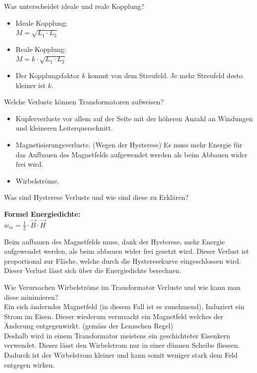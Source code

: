 \begin{karte}{Was unterscheidet ideale und reale Kopplung?}
	\begin{itemize}
		\item Ideale Kopplung:\\
		$ M = \sqrt{L_1 \cdot L_2} $
		\item Reale Kopplung:\\
		$ M = k \cdot \sqrt{L_1 \cdot L_2} $
		\item Der Kopplungsfaktor $k$ kommt von dem Streufeld. Je mehr Streufeld desto kleiner ist $k$.
	\end{itemize}
\end{karte}

\begin{karte}{Welche Verluste können Transformatoren aufweisen?}
	\begin{itemize}
		\item Kupferverluste vor allem auf der Seite mit der höheren Anzahl an Windungen und kleineren Leiterquerschnitt.
		\item Magnetisierungsverluste. (Wegen der Hysterese) Es muss mehr Energie für das Aufbauen des Magnetfelds aufgewendet werden als beim Abbauen wider frei wird.
		\item Wirbelströme.
	\end{itemize}
\end{karte}

\begin{karte}{Was sind Hysterese Verluste und wie sind diese zu Erklären?}
	\begin{minipage}{0.49\textwidth}
		
	\end{minipage}
	\begin{minipage}{0.49\textwidth}
		\textbf{Formel Energiedichte:}\\[10pt]
		$
			w_m = \frac{1}{2} \cdot \vec{B} \cdot \vec{H}
		$
	\end{minipage}
	Beim aufbauen des Magnetfelds muss, dank der Hysterese, mehr Energie aufgewendet werden, als beim abbauen wider frei gesetzt wird. Dieser Verlust ist proportional zur Fläche, welche durch die Hysteresekurve eingeschlossen wird. Dieser Verlust lässt sich über die Energiedichte berechnen.
\end{karte}

\begin{karte}{Wie Verursachen Wirbelströme im Transformator Verluste und wie kann man diese minimieren?}
	\\[5pt]
	Ein sich änderndes Magnetfeld (in diesem Fall ist es zunehmend), Induziert ein Strom im Eisen. Dieser wiederum verursacht ein Magnetfeld welches der Änderung entgegenwirkt. (gemäss der Lenzschen Regel)\\[5pt]
	Deshalb wird in einem Transformator meistens ein geschichteter Eisenkern verwendet. Dieser lässt den Wirbelstrom nur in einer dünnen Scheibe fliessen. Dadurch ist der Wirbelstrom kleiner und kann somit weniger stark dem Feld entgegen wirken. 
\end{karte}

